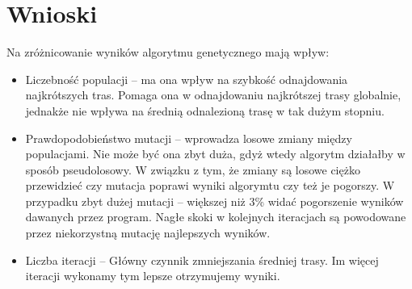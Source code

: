 \documentclass[a4paper,11pt]{article}
\begin{document}
	\section{Wnioski}
	Na zróżnicowanie wyników algorytmu genetycznego mają wpływ:
	\begin{itemize}
		\item Liczebność populacji -- ma ona wpływ na szybkość odnajdowania najkrótszych tras. Pomaga ona w odnajdowaniu najkrótszej trasy globalnie, jednakże nie wpływa na średnią odnalezioną trasę w tak dużym stopniu.
		\item Prawdopodobieństwo mutacji -- wprowadza losowe zmiany między populacjami. Nie może być ona zbyt duża, gdyż wtedy algorytm działałby w sposób pseudolosowy.
		W związku z tym, że zmiany są losowe ciężko przewidzieć czy mutacja poprawi wyniki algorymtu czy też je pogorszy. W przypadku zbyt dużej mutacji -- większej niż 3\% widać pogorszenie wyników dawanych przez program. Nagłe skoki w kolejnych iteracjach są powodowane przez niekorzystną mutację najlepszych wyników.
		\item Liczba iteracji -- Główny czynnik zmniejszania średniej trasy. Im więcej iteracji wykonamy tym lepsze otrzymujemy wyniki.
	\end{itemize}
	
	
	
\end{document}
